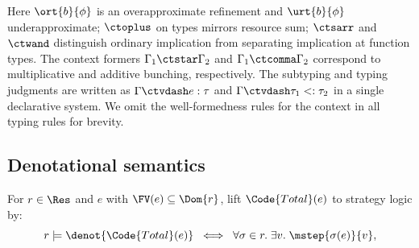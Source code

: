 Here $\ort{b}{\phi}$ is an overapproximate refinement and
$\urt{b}{\phi}$ underapproximate; $\ctoplus$ on types mirrors resource
sum; $\ctsarr$ and $\ctwand$ distinguish ordinary implication from separating
implication at function types.
The context formers $\Gamma_1 \ctstar \Gamma_2$ and
$\Gamma_1 \ctcomma \Gamma_2$ correspond to multiplicative and additive
bunching, respectively. The subtyping and typing judgments are written as
$\Gamma \ctvdash e : \tau$ and $\Gamma \ctvdash \tau_1 <: \tau_2$ in a single declarative system. We omit the well-formedness rules for the context in all typing rules for brevity.


\subsection{Denotational semantics}

\begin{definition}\label{def:total-under-resource}
For $r \in \Res$ and $e$ with $\FV(e) \subseteq \Dom{r}$, lift $\Code{Total}(e)$ to strategy logic by:
\[
  r \models \denot{\Code{Total}(e)} \;\iff\;
  \forall \sigma \in r.\; \exists v.\; \mstep{\sigma(e)}{v},
\]
\end{definition}

